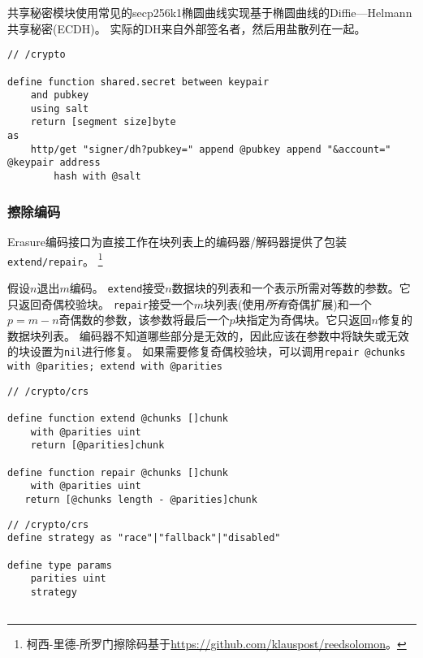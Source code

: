 共享秘密模块使用常见的secp256k1椭圆曲线实现基于椭圆曲线的Diffie—Helmann共享秘密(ECDH)。
实际的DH来自外部签名者，然后用盐散列在一起。

\begin{definition}\label{def:dh}
\begin{lstlisting}[language=buzz1]
// /crypto

define function shared.secret between keypair
    and pubkey
    using salt
    return [segment size]byte
as
    http/get "signer/dh?pubkey=" append @pubkey append "&account=" @keypair address
        hash with @salt

\end{lstlisting}
\end{definition}  

\subsubsection{擦除编码}\label{spec:format:erasure}

Erasure编码接口为直接工作在块列表上的编码器/解码器提供了包装\lstinline{extend/repair}。%
%
\footnote{柯西-里德-所罗门擦除码基于\url{https://github.com/klauspost/reedsolomon}。
}

假设$n$退出$m$编码。
\lstinline{extend}接受$n$数据块的列表和一个表示所需对等数的参数。它只返回奇偶校验块。
\lstinline{repair}接受一个$m$块列表(使用\emph{所有}奇偶扩展)和一个$p=m-n$奇偶数的参数，该参数将最后一个$p$块指定为奇偶块。它只返回$n$修复的数据块列表。
编码器不知道哪些部分是无效的，因此应该在参数中将缺失或无效的块设置为\lstinline{nil}进行修复。
如果需要修复奇偶校验块，可以调用\lstinline{repair @chunks with @parities; extend with @parities}

\begin{definition}\label{def:crs}
\begin{lstlisting}[language=buzz1]
// /crypto/crs

define function extend @chunks []chunk 
    with @parities uint
    return [@parities]chunk

define function repair @chunks []chunk   
    with @parities uint
   return [@chunks length - @parities]chunk

\end{lstlisting}
\end{definition}

\begin{definition}\label{def:crs-params}
\begin{lstlisting}[language=buzz1]
// /crypto/crs
define strategy as "race"|"fallback"|"disabled"

define type params 
    parities uint
    strategy 
     
\end{lstlisting}
\end{definition}


